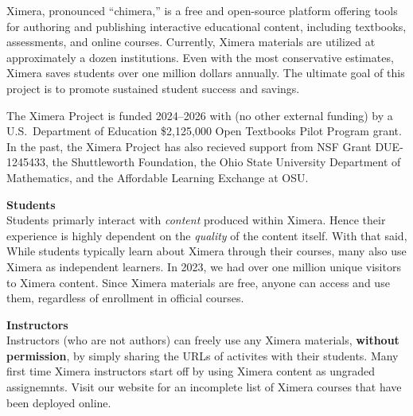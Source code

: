 \documentclass[twocolumn]{article}
\begin{document}
\pagestyle{main}
\thispagestyle{title}
    Ximera, pronounced ``chimera,'' is a free and
    open-source platform offering tools for authoring and publishing
    interactive educational content, including textbooks, assessments, and
    online
    courses. Currently, Ximera materials are utilized at approximately a dozen
    institutions. Even with the most conservative estimates, Ximera saves
    students
    over one million dollars annually. The ultimate goal of this project is to
    promote sustained student success and savings.

    The Ximera Project is funded 2024--2026 with (no other external funding) by
    a U.S.\ Department of Education \$2,125,000
    Open Textbooks Pilot Program grant. In the past, the Ximera Project has
    also recieved support from NSF Grant
    DUE-1245433, the Shuttleworth Foundation, the Ohio State University
    Department of Mathematics, and the Affordable Learning Exchange at OSU.

    \begin{xframe}
        {\sffamily\bfseries Students}\\
        Students primarly interact with \textit{content} produced within
        Ximera. Hence their experience is highly dependent on the
        \textit{quality} of
        the content itself. With that said,
        While students typically learn about Ximera through their courses, many
        also use Ximera as independent learners. In 2023, we had over one
        million unique visitors to Ximera content. Since Ximera materials are
        free,
        anyone can access and use them, regardless of enrollment in official
        courses.
    \end{xframe}

    \begin{xframe}
        {\sffamily\bfseries Instructors}\\
        Instructors (who are not authors) can freely use any Ximera materials,
        \textbf{without permission}, by simply sharing the URLs of activites
        with their students. Many first time Ximera instructors start off by
        using Ximera content as
        ungraded assignemnts. Visit our website for an incomplete list of
        Ximera courses that have been deployed online.
    \end{xframe}
\end{document}
